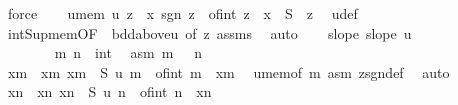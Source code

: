 \begin{isabellebody}
\ force{\isacharplus}{\kern0pt}\isanewline
\isanewline
\ \ \isamarkupfalse%
\ u{\isacharunderscore}{\kern0pt}mem{\isacharcolon}{\kern0pt}\ {\isachardoublequoteopen}u\ z\ {\isasymin}\ {\isacharparenleft}{\kern0pt}{\isasymlambda}x{\isachardot}{\kern0pt}\ sgn\ z\ {\isacharasterisk}{\kern0pt}\ {\isasymlfloor}of{\isacharunderscore}{\kern0pt}int\ {\isasymbar}z{\isasymbar}\ {\isacharasterisk}{\kern0pt}\ x{\isasymrfloor}{\isacharparenright}{\kern0pt}\ {\isacharbackquote}{\kern0pt}\ S{\isachardoublequoteclose}\ \ z\ \isamarkupfalse%
\ u{\isacharunderscore}{\kern0pt}def\ \ \isamarkupfalse%
\ int{\isacharunderscore}{\kern0pt}Sup{\isacharunderscore}{\kern0pt}mem{\isacharbrackleft}{\kern0pt}OF\ {\isacharunderscore}{\kern0pt}\ bdd{\isacharunderscore}{\kern0pt}above{\isacharunderscore}{\kern0pt}u{\isacharcomma}{\kern0pt}\ of\ z{\isacharbrackright}{\kern0pt}\ assms\ \isamarkupfalse%
\ auto\isanewline
\isanewline
\ \ \isamarkupfalse%
\ slope{\isacharcolon}{\kern0pt}\ {\isachardoublequoteopen}slope\ u{\isachardoublequoteclose}\isanewline
\ \ \isamarkupfalse%
\ {\isacharminus}{\kern0pt}\isanewline
\ \ \ \ \isacommand{{\isacharbraceleft}{\kern0pt}}\isamarkupfalse%
\isanewline
\ \ \ \ \ \ \isamarkupfalse%
\ m\ n\ {\isacharcolon}{\kern0pt}{\isacharcolon}{\kern0pt}\ int\ \isamarkupfalse%
\ asm{\isacharcolon}{\kern0pt}\ {\isachardoublequoteopen}m\ {\isachargreater}{\kern0pt}\ {}{\isachardoublequoteclose}\ {\isachardoublequoteopen}n\ {\isachargreater}{\kern0pt}\ {}{\isachardoublequoteclose}\isanewline
\ \ \ \ \ \ \isamarkupfalse%
\ x{\isacharunderscore}{\kern0pt}m\ \ x{\isacharunderscore}{\kern0pt}m{\isacharcolon}{\kern0pt}\ {\isachardoublequoteopen}x{\isacharunderscore}{\kern0pt}m\ {\isasymin}\ S{\isachardoublequoteclose}\ {\isachardoublequoteopen}u\ m\ {\isacharequal}{\kern0pt}\ {\isasymlfloor}of{\isacharunderscore}{\kern0pt}int\ m\ {\isacharasterisk}{\kern0pt}\ x{\isacharunderscore}{\kern0pt}m{\isasymrfloor}{\isachardoublequoteclose}\ \isamarkupfalse%
\ u{\isacharunderscore}{\kern0pt}mem{\isacharbrackleft}{\kern0pt}of\ m{\isacharbrackright}{\kern0pt}\ asm\ zsgn{\isacharunderscore}{\kern0pt}def\ \isamarkupfalse%
\ auto\isanewline
\ \ \ \ \ \ \isamarkupfalse%
\ x{\isacharunderscore}{\kern0pt}n\ \ x{\isacharunderscore}{\kern0pt}n{\isacharcolon}{\kern0pt}\ {\isachardoublequoteopen}x{\isacharunderscore}{\kern0pt}n\ {\isasymin}\ S{\isachardoublequoteclose}\ {\isachardoublequoteopen}u\ n\ {\isacharequal}{\kern0pt}\ {\isasymlfloor}of{\isacharunderscore}{\kern0pt}int\ n\ {\isacharasterisk}{\kern0pt}\ x{\isacharunderscore}{\kern0pt}n{\isasymrfloor}{\isachardoublequoteclose}\ \isamarkupfalse%

\end{isabellebody}

